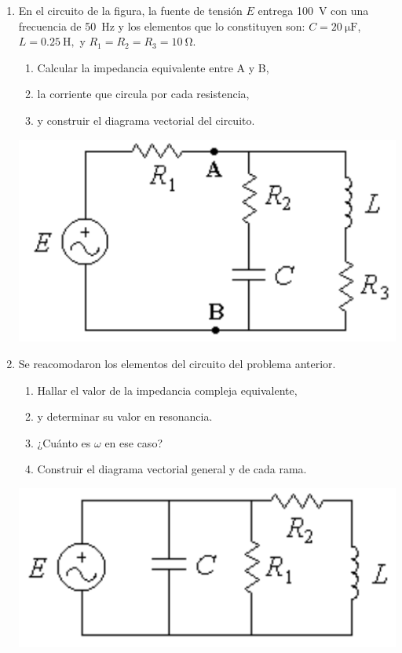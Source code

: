 \documentclass[11pt,spanish,a4paper]{article}
\begin{document}
\begin{enumerate}
	\item \begin{minipage}[t]{0.65\textwidth}
		En el circuito de la figura, la fuente de tensión \(E\) entrega \SI{100}{\volt} con una frecuencia de \SI{50}{\hertz} y los elementos que lo constituyen son: \(C= \SI{20}{\micro\farad}\), \(L= \SI{0.25}{\henry},\) y \(R_1= R_2= R_3= \SI{10}{\ohm}\).
		\begin{enumerate}
			\item Calcular la impedancia equivalente entre A y B,
			\item la corriente que circula por cada resistencia, 
			\item y construir el diagrama vectorial del circuito.
		\end{enumerate}
	\end{minipage}
	\begin{minipage}[c][1em][t]{0.3\textwidth}
		\includegraphics[width=\textwidth]{p6e05}
	\end{minipage}


	\item \begin{minipage}[t]{0.65\textwidth}
		Se reacomodaron los elementos del circuito del problema anterior. 
		\begin{enumerate}
			\item Hallar el valor de la impedancia compleja equivalente, 
			\item y determinar su valor en resonancia.
			\item ¿Cuánto es \(\omega\) en ese caso?
			\item Construir el diagrama vectorial general y de cada rama.
		\end{enumerate}
	\end{minipage}
	\begin{minipage}[c][1em][t]{0.3\textwidth}
		\includegraphics[width=\textwidth]{p6e06}
	\end{minipage}



\end{enumerate}
\end{document}
